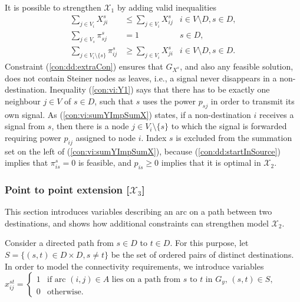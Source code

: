 It is possible to strengthen $\mathcal{X}_1$ by adding valid inequalities
\begin{subequations}[resume]
\begin{align}
\label{con:dd:extraCon} \sum\limits_{j\in V_{i}}X^s_{ji} & \leq \sum\limits_{j\in V_{i}}X^s_{ij}  & 	i\in V\setminus D, s\in D,\\
\label{con:vi:Y1} \sum\limits_{j\in V_s}  \pi^{s}_{sj} & =1 & s\in D,\\
\label{con:vi:sumYImpSumX} \sum\limits_{j\in V_i\setminus\{s\} }\pi^{s}_{ij} & \geq \sum\limits_{j\in V_i}  X^{s}_{ji} & i\in V\setminus D, s\in D.
\end{align}
\end{subequations}
Constraint (\ref{con:dd:extraCon}) ensures that $G_{X^s}$, and also any feasible solution, does not contain Steiner nodes as leaves, i.e., a signal never disappears in a non-destination.
Inequality (\ref{con:vi:Y1}) says that there has to be exactly one neighbour $j\in V$ of $s\in D$, such that $s$ uses the power $p_{sj}$ in order to transmit its own signal.
As (\ref{con:vi:sumYImpSumX}) states, if a non-destination $i$ receives a signal from $s$, then there is a node $j\in V_i\setminus\{s\}$ to which the signal is forwarded requiring power $p_{ij}$ assigned to node $i$.
Index $s$ is excluded from the summation set on the left of (\ref{con:vi:sumYImpSumX}), because (\ref{con:dd:startInSource}) implies that $\pi_{is}^s=0$ is feasible, and $p_{is}\geq 0$ implies that it is optimal in $\mathcal{X}_2$. 

\subsubsection{Point to point extension [$\mathcal{X}_3$]}
\label{sec:smtx2}

This section introduces variables describing an arc on a path between two destinations, and shows how additional constraints can strengthen model $\mathcal{X}_2$.

Consider a directed path from $s\in D$ to $t\in D$.
For this purpose, let $S=\{(s,t)\in D\times D, s\neq t\}$ be the set of ordered pairs of distinct destinations.
In order to model the connectivity requirements, we introduce variables
\newline\newline
$x_{ij}^{st}=
\begin{cases}
    1 & \text{if arc $(i,j) \in A$ lies on a path from $s$ to $t$ in $G_y$, $(s,t)\in S$},\\
    0 & \text{otherwise}.
\end{cases}$
\newline\newline

